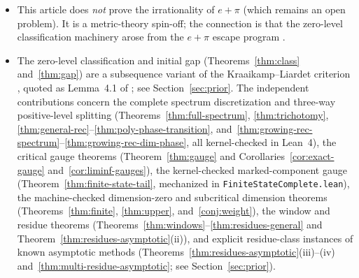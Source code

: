 \documentclass[11pt]{article}
\theoremstyle{definition}
\theoremstyle{remark}
\begin{document}
\begin{itemize}[leftmargin=1.5em]
\texttt{AuditResidueMultiAsymptotic.lean}, base axioms only, zero \texttt{sorryAx},
log \texttt{verification/\allowbreak audit\_\allowbreak residue\_\allowbreak multi\_\allowbreak asymptotic\_\allowbreak 20261123.log})
and numerically corroborated by
\texttt{verify\_\allowbreak residue\_\allowbreak multi\_\allowbreak asymptotic.py}.
\item This article does \emph{not} prove the irrationality of $e+\pi$ (which
remains an open problem). It is a metric-theory spin-off; the connection is
that the zero-level classification machinery arose from the $e+\pi$ escape
program \cite{Phase1}.
\item The zero-level classification and initial gap (Theorems~\ref{thm:class}
and~\ref{thm:gap}) are a subsequence variant of the Kraaikamp--Liardet
criterion \cite{KL}, quoted as Lemma~4.1 of \cite{BDS}; see
Section~\ref{sec:prior}. The independent contributions concern the complete
spectrum discretization and three-way positive-level splitting
(Theorems~\ref{thm:full-spectrum}, \ref{thm:trichotomy},
\ref{thm:general-rec}--\ref{thm:poly-phase-transition},
and~\ref{thm:growing-rec-spectrum}--\ref{thm:growing-rec-dim-phase}, all kernel-checked
in Lean~4), the critical gauge theorems
(Theorem~\ref{thm:gauge} and Corollaries~\ref{cor:exact-gauge}
and~\ref{cor:liminf-gauges}), the kernel-checked marked-component gauge
(Theorem~\ref{thm:finite-state-tail}, mechanized in
\texttt{Finite\allowbreak State\allowbreak Complete.lean}), the machine-checked
dimension-zero and subcritical dimension theorems
(Theorems~\ref{thm:finite}, \ref{thm:upper}, and~\ref{conj:weight}), the
window and residue theorems (Theorems~\ref{thm:windows}--\ref{thm:residues-general}
and Theorem~\ref{thm:residues-asymptotic}(ii)), and explicit residue-class
instances of known asymptotic methods
(Theorems~\ref{thm:residues-asymptotic}(iii)--(iv)
and~\ref{thm:multi-residue-asymptotic}; see Section~\ref{sec:prior}).
\end{itemize}
\end{document}
